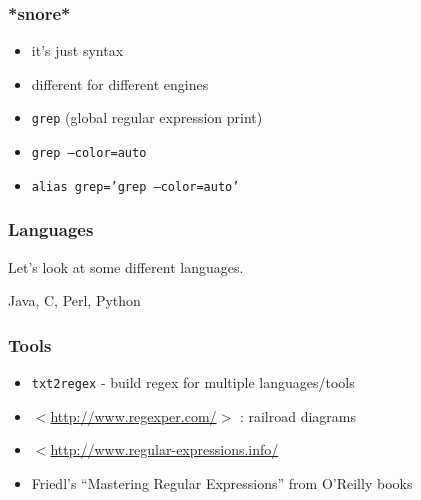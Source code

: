 \documentclass[%
        hyperref={%
                pdfauthor={Zakariyya Mughal},%
                pdfpagemode={None},pdfpagelayout={SinglePage}}%
        xcolor={x11names},%
]{beamer}
\begin{document}
\begin{frame}
	\frametitle{*snore*}
	\begin{itemize}
		\item it's just syntax
		\item different for different engines 
		\item \texttt{grep} (global regular expression print)
		\item \texttt{grep --color=auto}
		\item \texttt{alias grep='grep --color=auto'}
	\end{itemize}
\end{frame}

\begin{frame}
	\frametitle{Languages}
	Let's look at some different languages.

	Java, C, Perl, Python
\end{frame}

\begin{frame}
	\frametitle{Tools}
	\begin{itemize}
		\item \texttt{txt2regex} - build regex for multiple languages/tools
		\item $<$\href{http://www.regexper.com/}{http://www.regexper.com/}$>$
			: railroad diagrams
		\item $<$\href{http://www.regular-expressions.info/}{http://www.regular-expressions.info/}
		\item Friedl's ``Mastering Regular Expressions''
			from O'Reilly books
	\end{itemize}
\end{frame}
\end{document}
